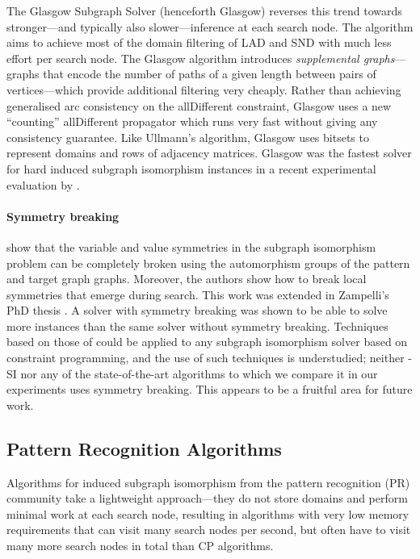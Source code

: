 The Glasgow Subgraph Solver
\citep{DBLP:conf/cp/McCreeshP15,DBLP:conf/gg/McCreeshP020} (henceforth Glasgow)
reverses this trend towards stronger---and typically also slower---inference
at each search node.  The
algorithm aims to achieve most of the domain filtering of LAD and SND with much
less effort per search node.
The Glasgow algorithm introduces
\emph{supplemental graphs}---graphs that encode the number of paths
of a given length between pairs of vertices---which provide additional filtering
very cheaply.
Rather than achieving generalised arc consistency on the allDifferent
constraint, Glasgow uses a new ``counting'' allDifferent propagator which runs
very fast without giving any consistency guarantee.
Like Ullmann's algorithm, Glasgow uses bitsets to represent domains and rows
of adjacency matrices.
Glasgow was the fastest solver for hard induced
subgraph isomorphism instances in a recent experimental evaluation by
\citet{DBLP:conf/gbrpr/Solnon19}.

\paragraph*{Symmetry breaking}
\citet{zampelli2007symmetry} show that the variable and value symmetries
in the subgraph isomorphism problem can be completely broken using
the automorphism groups of the pattern and target graph graphs.
Moreover, the authors show how to break local symmetries that emerge
during search.
This work was extended in Zampelli's PhD thesis \citep{DBLP:phd/basesearch/Zampelli08}.
A solver with symmetry breaking was shown to be able to solve more instances
than the same solver without symmetry breaking. 
Techniques based on those of \citeauthor{zampelli2007symmetry} 
could be applied to any subgraph isomorphism solver based on constraint programming,
and the use of such techniques is understudied; neither \McSplit-SI nor any of
the state-of-the-art algorithms to which we compare it in our experiments
uses symmetry breaking.  This appears to be a fruitful area for future
work.

\subsection{Pattern Recognition Algorithms}\label{subsec:pr-sip}

Algorithms for induced subgraph isomorphism from the pattern recognition (PR) community
take a lightweight approach---they do not store domains and perform
minimal work at each search node, resulting in algorithms with very low memory
requirements that can visit many search nodes per second, but often have to
visit many more search nodes in total than CP algorithms.

